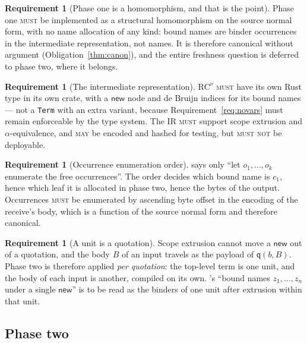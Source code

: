 \documentclass[11pt,a4paper]{article}
\newcommand{\code}[1]{\texttt{#1}}
\newcommand{\MUST}{\textsc{must}}
\newcommand{\MUSTNOT}{\textsc{must not}}
\newcommand{\MAY}{\textsc{may}}
\newcommand{\qq}{\mathsf{q}}
\theoremstyle{definition}
\newtheorem{requirement}[definition]{Requirement}
\theoremstyle{plain}
\begin{document}
\begin{requirement}[Phase one is a homomorphism, and that is the point]
\label{req:phase1hom}
Phase one \MUST{} be implemented as a structural homomorphism on the source
normal form, with no name allocation of any kind: bound names are binder
occurrences in the intermediate representation, not names. It is therefore
canonical without argument (Obligation~\ref{thm:canon}), and the entire
freshness question is deferred to phase two, where it belongs.
\end{requirement}

\begin{requirement}[The intermediate representation]\label{req:irtype}
$\mathrm{RC}^{\nu}$ \MUST{} have its own Rust type in its own crate, with a
$\mathsf{new}$ node and de Bruijn indices for its bound names --- not a
\code{Term} with an extra variant, because
Requirement~\ref{req:novars} must remain enforceable by the type system. The
IR \MUST{} support scope extrusion and $\alpha$-equivalence, and \MAY{} be
encoded and hashed for testing, but \MUSTNOT{} be deployable.
\end{requirement}

\begin{requirement}[Occurrence enumeration order]\label{req:occorder}
\cite[Def.~6.3]{draft3} says only ``let $o_{1},\dots,o_{k}$ enumerate the free
occurrences''. The order decides which bound name is $c_{1}$, hence which leaf
it is allocated in phase two, hence the bytes of the output. Occurrences
\MUST{} be enumerated by ascending byte offset in the encoding of the
receive's body, which is a function of the source normal form and therefore
canonical.
\end{requirement}

\begin{requirement}[A unit is a quotation]\label{req:units}
Scope extrusion cannot move a $\mathsf{new}$ out of a quotation, and the body
$B$ of an input travels as the payload of $\qq(b,B)$. Phase two is therefore
applied \emph{per quotation}: the top-level term is one unit, and the body of
each input is another, compiled on its own. \cite[Def.~6.8]{draft3}'s ``bound
names $z_{1},\dots,z_{n}$ under a single $\mathsf{new}$'' is to be read as the
binders of one unit after extrusion within that unit.
\end{requirement}

\subsection{Phase two}\label{sec:phase2}
\end{document}
